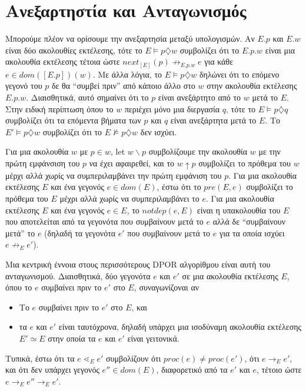 \section{Ανεξαρτηστία και Ανταγωνισμός}

Μπορούμε πλέον να ορίσουμε την ανεξαρτησία μεταξύ υπολογισμών. Αν
$E.p$ και $E.w$ είναι δύο ακολουθίες εκτέλεσης, τότε το $E \models p\diamondsuit w$ συμβολίζει
ότι το $E.p.w$ είναι μια ακολουθία εκτέλεσης τέτοια ώστε $next_{[E]}(p) \not \rightarrow_{E.p.w} e$
για κάθε $e \in dom([E.p])(w)$. Με άλλα λόγια, το $E \models p \diamondsuit w$ δηλώνει ότι
το επόμενο γεγονό του $p$ δε θα “συμβεί πριν” από κάποιο άλλο στο $w$
στην ακολουθία εκτέλεσης $E.p.w$. Διαισθητικά, αυτό σημαίνει ότι το $p$ είναι
ανεξάρτητο από το $w$ μετά το $E$. Στην ειδική περίπτωση όπου το  $w$ περιέχει
μόνο μια διεργασία $q$, τότε το $E \models p \diamondsuit q$ συμβολίζει ότι τα επόμεντα βήματα των 
$p$ και $q$ είναι ανεξάρτητα μετά το $E$. Το $E'\models p \diamondsuit w$ συμβολίζει ότι το 
$E \not \models p \diamondsuit w$ δεν ισχύει.

Για μια ακολουθία $w$ με $p \in w$, let $w \backslash p$ συμβολίζουμε την ακολουθία
$w$ με την πρώτη εμφάνσιση του $p$ να έχει αφαιρεθεί, και το $w \uparrow p$ συμβολίζει
το πρόθεμα του $w$ μέρχι αλλά χωρίς να συμπεριλαμβάνει την πρώτη εμφάνιση του $p$. Για
μια ακολουθία εκτέλεσης $E$ και ένα γεγονός $e \in  dom(E)$, έστω ότι το $pre(E,e)$
συμβολίζει το πρόθεμα του $E$ μέχρι αλλά χωρίς να συμπεριλαμβάνει το $e$. Για μια
ακολουθία εκτέλεσης $E$ και ένα γεγονός $e \in E$, το $notdep(e, E)$ είναι η
υπακολουθία του $E$ που αποτελείται από τα γεγονότα που συμβαίνουν μετά το $e$ αλλά δε 
“συμβαίνουν μετά” το $e$ (δηλαδή τα γεγονότα  $e'$ που συμβαίνουν μετά το $e$ για τα οποία ισχύει
$e \not \rightarrow_E e'$).


Μια κεντρική έννοια στους περισσότερους DPOR αλγορίθμου είναι αυτή του ανταγωνισμού.
Διαισθητικά, δύο γεγονότα $e$ και $e'$ σε μια ακολουθία εκτέλεσης $E$, όπου το
$e$ συμβαίνει πριν το $e'$ στο $E$, συναγωνίζοναι αν
\begin{itemize}
\item Το $e$ συμβαίνει πριν το $e'$ στο  $E$, και
\item τα $e$ και $e'$ είναι ταυτόχρονα, δηλαδή υπάρχει μια ισοδύναμη ακολουθία εκτέλεσης 
$E' \simeq E$ στην οποία τα $e$ και $e'$ είναι γειτονικά.
\end{itemize}
Τυπικά, έστω ότι τα $e \lessdot_E e'$ συμβολίζουν ότι  $proc(e) \not = proc(e')$, ότι $e \rightarrow_E e'$,
και ότι δεν υπάρχει γεγονός  $e'' \in dom(E)$, διαφορετικό από τα $e'$ και $e$,
τέτοιο ώστε $e \rightarrow_E e'' \rightarrow_E e'$.

